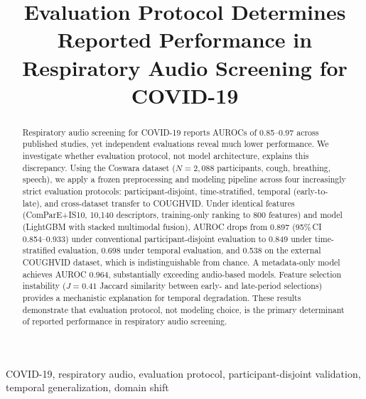 \documentclass[conference]{IEEEtran}
\begin{document}
\title{Evaluation Protocol Determines Reported Performance in Respiratory Audio Screening for COVID-19}

\author{
\and
{}
}

\maketitle

\begin{abstract}
Respiratory audio screening for COVID-19 reports AUROCs of 0.85--0.97 across published studies, yet independent evaluations reveal much lower performance. We investigate whether evaluation protocol, not model architecture, explains this discrepancy. Using the Coswara dataset ($N{=}2{,}088$ participants, cough, breathing, speech), we apply a frozen preprocessing and modeling pipeline across four increasingly strict evaluation protocols: participant-disjoint, time-stratified, temporal (early-to-late), and cross-dataset transfer to COUGHVID. Under identical features (ComParE+IS10, 10{,}140 descriptors, training-only ranking to 800 features) and model (LightGBM with stacked multimodal fusion), AUROC drops from 0.897 (95\%\,CI 0.854--0.933) under conventional participant-disjoint evaluation to 0.849 under time-stratified evaluation, 0.698 under temporal evaluation, and 0.538 on the external COUGHVID dataset, which is indistinguishable from chance. A metadata-only model achieves AUROC 0.964, substantially exceeding audio-based models. Feature selection instability ($J{=}0.41$ Jaccard similarity between early- and late-period selections) provides a mechanistic explanation for temporal degradation. These results demonstrate that evaluation protocol, not modeling choice, is the primary determinant of reported performance in respiratory audio screening.
\end{abstract}

\begin{IEEEkeywords}
COVID-19, respiratory audio, evaluation protocol, participant-disjoint validation, temporal generalization, domain shift
\end{IEEEkeywords}
\end{document}
